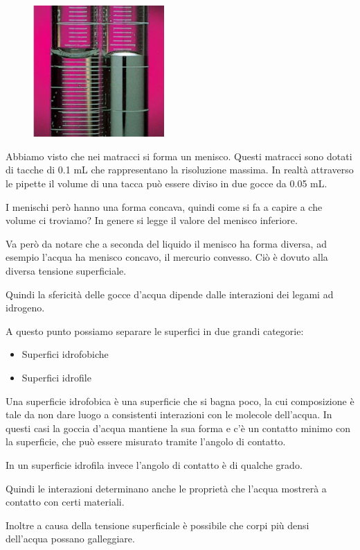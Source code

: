 \hspace{0.5cm}\begin{minipage}{0.35 \textwidth}
    \begin{figure}[H]
        \includegraphics[width=5cm]{immagini/menischi.png}
    \end{figure}
\end{minipage}
\begin{minipage}{0.6 \textwidth}
    \vspace{0.6cm}Abbiamo visto che nei matracci si forma un menisco.
    Questi matracci sono dotati di tacche di 0.1 mL che rappresentano la risoluzione massima. In realtà attraverso le pipette il volume di una tacca può essere diviso in due gocce da 0.05 mL.

    I menischi però hanno una forma concava, quindi come si fa a capire a che volume ci troviamo? In genere si legge il valore del menisco inferiore.

    Va però da notare che a seconda del liquido il menisco ha forma diversa, ad esempio l'acqua ha menisco concavo, il mercurio convesso. Ciò è dovuto alla diversa tensione superficiale.
\end{minipage}

\vspace{0.2cm}Quindi la sfericità delle gocce d'acqua dipende dalle interazioni dei legami ad idrogeno.

A questo punto possiamo separare le superfici in due grandi categorie:

\begin{itemize}
    \item Superfici idrofobiche
    \item Superfici idrofile
\end{itemize}

Una superficie idrofobica è una superficie che si bagna poco, la cui composizione è tale da non dare luogo a consistenti interazioni con le molecole dell'acqua. In questi casi la goccia d'acqua mantiene la sua forma e c'è un contatto minimo con la superficie, che può essere misurato tramite l'angolo di contatto.

In un superficie idrofila invece l'angolo di contatto è di qualche grado.

Quindi le interazioni determinano anche le proprietà che l'acqua mostrerà a contatto con certi materiali.

Inoltre a causa della tensione superficiale è possibile che corpi più densi dell'acqua possano galleggiare.